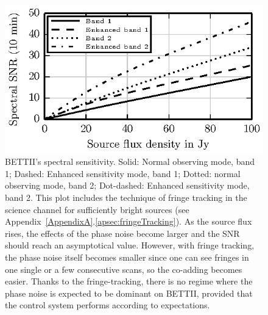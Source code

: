 \begin{figure}[!h]
\begin{center}
\includegraphics[width=\textwidth]{Figures/f4.eps}
\caption[BETTII Spectral SNR]{%
BETTII's spectral sensitivity. Solid: Normal observing mode, band 1; Dashed: Enhanced sensitivity mode, band 1; Dotted: normal observing mode, band 2; Dot-dashed: Enhanced sensitivity mode, band 2. This plot includes the technique of fringe tracking in the science channel for sufficiently bright sources (see Appendix~\ref{AppendixA}.\ref{apsec:fringeTracking}). As the source flux rises, the effects of the phase noise become larger and the SNR should reach an asymptotical value. However, with fringe tracking, the phase noise itself becomes smaller since one can see fringes in one single or a few consecutive scans, so the co-adding becomes easier. Thanks to the fringe-tracking, there is no regime where the phase noise is expected to be dominant on BETTII, provided that the control system performs according to expectations.}
\label{fig:SpectralSNR}
\end{center}
\end{figure}

